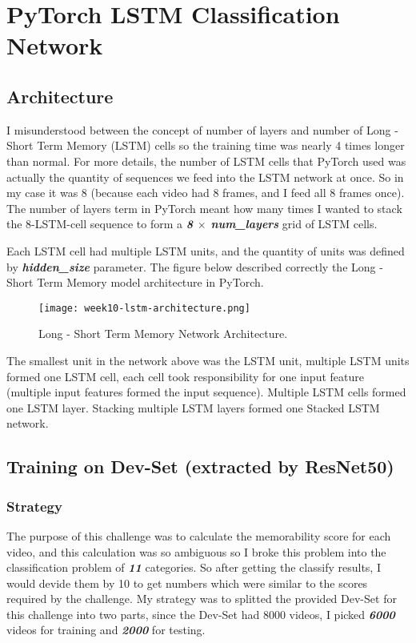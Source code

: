 \section{PyTorch LSTM Classification Network}
\subsection{Architecture}
I misunderstood between the concept of number of layers and number of Long - Short Term Memory (LSTM) cells so the training time was nearly 4 times longer than normal. For more details, the number of LSTM cells that PyTorch used was actually the quantity of sequences we feed into the LSTM network at once. So in my case it was 8 (because each video had 8 frames, and I feed all 8 frames once). The number of layers term in PyTorch meant how many times I wanted to stack the 8-LSTM-cell sequence to form a  \textbf{\emph{8 \( \times \) num\_layers}} grid of LSTM cells.

Each LSTM cell had multiple LSTM units, and the quantity of units was defined by \textbf{\emph{hidden\_size}} parameter. The figure below described correctly the Long - Short Term Memory model architecture in PyTorch.

\begin{figure}[!ht]
\centering
\texttt{[image: week10-lstm-architecture.png]}
\caption{Long - Short Term Memory Network Architecture.}
\end{figure}

The smallest unit in the network above was the LSTM unit, multiple LSTM units formed one LSTM cell, each cell took responsibility for one input feature (multiple input features formed the input sequence). Multiple LSTM cells formed one LSTM layer. Stacking multiple LSTM layers formed one Stacked LSTM network.

\subsection{Training on Dev-Set (extracted by ResNet50)}
\subsubsection{Strategy}
The purpose of this challenge was to calculate the memorability score for each video, and this calculation was so ambiguous so I broke this problem into the classification problem of \textbf{\emph{11}} categories. So after getting the classify results, I would devide them by 10 to get numbers which were similar to the scores required by the challenge. My strategy was to splitted the provided Dev-Set for this challenge into two parts, since the Dev-Set had 8000 videos, I picked \textbf{\emph{6000}} videos for training and \textbf{\emph{2000}} for testing.

